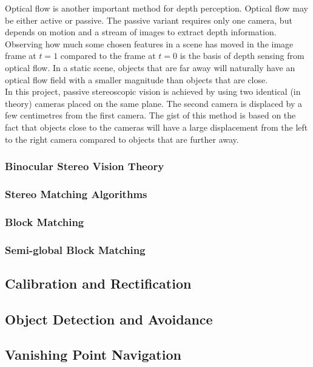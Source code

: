 Optical flow is another important method for depth perception. Optical flow may be either active or passive. The passive variant requires  only one camera, but depends on motion and a stream of images to extract depth information. Observing how much some chosen features in a scene has moved in the image frame at $t = 1$ compared to the frame at $t = 0$ is the basis of depth sensing from optical flow. In a static scene, objects that are far away will naturally have an optical flow field with a smaller magnitude than objects that are close. \\

In this project, passive stereoscopic vision is achieved by using two identical (in theory) cameras placed on the same plane. The second camera is displaced by a few centimetres from the first camera. The gist of this method is based on the fact that objects close to the cameras will have a large displacement from the left to the right camera compared to objects that are further away. 

\subsubsection{Binocular Stereo Vision Theory}

\subsubsection{Stereo Matching Algorithms}

\subsubsection{Block Matching}

\subsubsection{Semi-global Block Matching}

\subsection{Calibration and Rectification}


\subsection{Object Detection and Avoidance}

\subsection{Vanishing Point Navigation}

